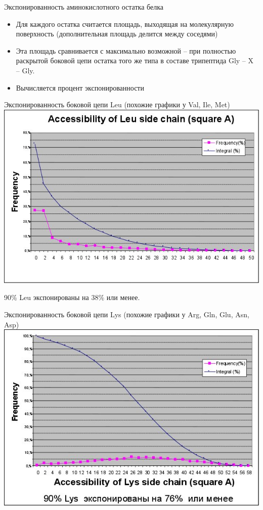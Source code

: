 \documentclass{beamer}
\begin{document}
    \begin{frame}{Экспонированность аминокислотного остатка белка}
        \begin{itemize}
            \item Для каждого остатка считается площадь, выходящая на
                молекулярную поверхность
                (дополнительная площадь делится между соседями)
            \item Эта площадь сравнивается с максимально возможной --
                при полностью раскрытой боковой цепи остатка того же типа
                в составе трипептида  Gly -- X -- Gly.
            \item Вычисляется процент экспонированности
        \end{itemize}
    \end{frame}

    \begin{frame}{Экспонированность боковой цепи Leu}
        {(похожие графики у Val, Ile, Met)}
        \includegraphics[height=0.8\textheight]{exp-leu.jpg}

        90\% Leu экспонированы на 38\% или менее.
    \end{frame}

    \begin{frame}{Экспонированность боковой цепи Lys}
        {(похожие графики у Arg, Gln, Glu, Asn, Asp)}
        \includegraphics[height=0.8\textheight]{exp-lys.jpg}
    \end{frame}
\end{document}
